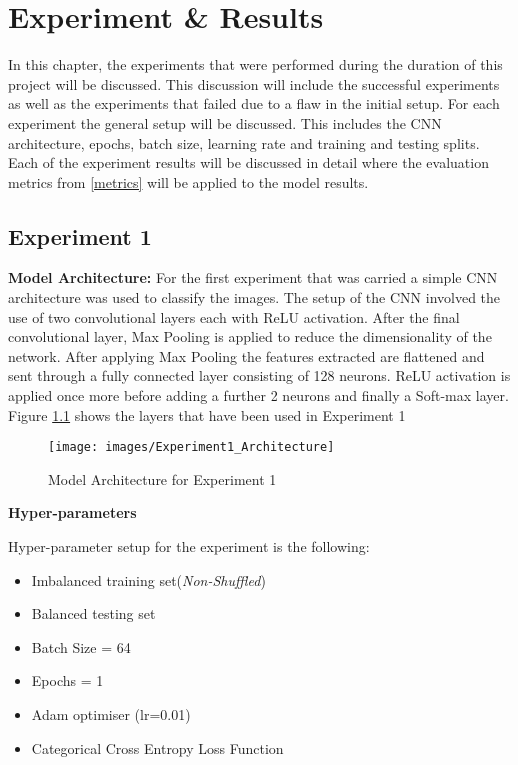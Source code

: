 
\chapter{Experiment \& Results}


In this chapter, the experiments that were performed during the duration of this project will be discussed. This discussion will include the successful experiments as well as the experiments that failed due to a flaw in the initial setup. For each experiment the general setup will be discussed. This includes the CNN architecture, epochs, batch size, learning rate and training and testing splits. Each of the experiment results will be discussed in detail where the evaluation metrics from \ref{metrics} will be applied to the model results.  

\section{Experiment 1}



\textbf{Model Architecture:} 
For the first experiment that was carried a simple CNN architecture was used to classify the images. The setup of the CNN involved the use of two convolutional layers each with ReLU activation. After the final convolutional layer, Max Pooling is applied to reduce the dimensionality of the network. After applying Max Pooling the features extracted are flattened and sent through a fully connected layer consisting of 128 neurons. ReLU activation is applied once more before adding a further 2 neurons and finally a Soft-max layer. Figure \ref{fig:exp1} shows the layers that have been used in Experiment 1


\begin{figure}[H]
	\centering
	\texttt{[image: images/Experiment1\_Architecture]}
	\caption{Model Architecture for Experiment 1}
	\label{fig:exp1}
\end{figure}



\textbf{Hyper-parameters}

Hyper-parameter setup for the experiment is the following: 

\begin{itemize}

\item Imbalanced training set(\textit{Non-Shuffled})
\item Balanced testing set 
\item Batch Size = 64
\item Epochs = 1
\item Adam optimiser (lr=0.01) 
\item Categorical Cross Entropy Loss Function


\end{itemize}

